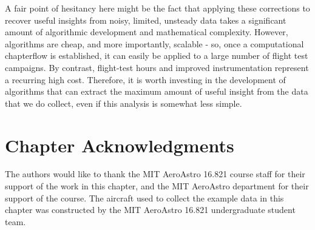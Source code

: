 A fair point of hesitancy here might be the fact that applying these corrections to recover useful insights from noisy, limited, unsteady data takes a significant amount of algorithmic development and mathematical complexity. However, algorithms are cheap, and more importantly, scalable - so, once a computational chapterflow is established, it can easily be applied to a large number of flight test campaigns. By contrast, flight-test hours and improved instrumentation represent a recurring high cost. Therefore, it is worth investing in the development of algorithms that can extract the maximum amount of useful insight from the data that we do collect, even if this analysis is somewhat less simple.



%
%

\section*{Chapter Acknowledgments}
The authors would like to thank the MIT AeroAstro 16.821 course staff for their support of the work in this chapter, and the MIT AeroAstro department for their support of the course. The aircraft used to collect the example data in this chapter was constructed by the MIT AeroAstro 16.821 undergraduate student team.

%    
